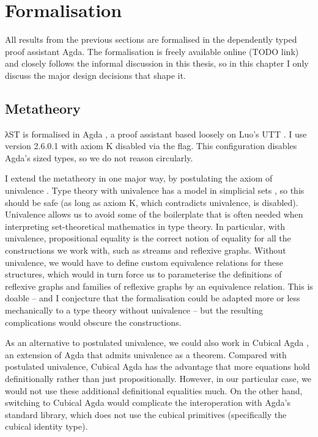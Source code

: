\chapter{Formalisation}
\label{sec:formalisation}

All results from the previous sections are formalised in the dependently typed
proof assistant Agda. The formalisation is freely available online (TODO link)
and closely follows the informal discussion in this thesis, so in this chapter I
only discuss the major design decisions that shape it.


\section{Metatheory}
\label{sec:formalisation:metatheory}

λST is formalised in Agda \cite{norellphd}, a proof assistant based loosely on
Luo's UTT \cite{luo1992}. I use version 2.6.0.1 with axiom K disabled via the
 flag. This configuration disables Agda's sized types, so we
do not reason circularly.

I extend the metatheory in one major way, by postulating the axiom of univalence
\cite{hottbook}. Type theory with univalence has a model in simplicial sets
\cite{kapulkin2012}, so this should be safe (as long as axiom K, which
contradicts univalence, is disabled). Univalence allows us to avoid some of the
boilerplate that is often needed when interpreting set-theoretical mathematics
in type theory. In particular, with univalence, propositional equality is the
correct notion of equality for all the constructions we work with, such as
streams and reflexive graphs. Without univalence, we would have to define custom
equivalence relations for these structures, which would in turn force us to
parameterise the definitions of reflexive graphs and families of reflexive
graphs by an equivalence relation. This is doable -- and I conjecture that the
formalisation could be adapted more or less mechanically to a type theory
without univalence -- but the resulting complications would obscure the
constructions.

As an alternative to postulated univalence, we could also work in Cubical Agda
\cite{vezzosi2019}, an extension of Agda that admits univalence as a theorem.
Compared with postulated univalence, Cubical Agda has the advantage that more
equations hold definitionally rather than just propositionally. However, in our
particular case, we would not use these additional definitional equalities much.
On the other hand, switching to Cubical Agda would complicate the interoperation
with Agda's standard library, which does not use the cubical primitives
(specifically the cubical identity type).


